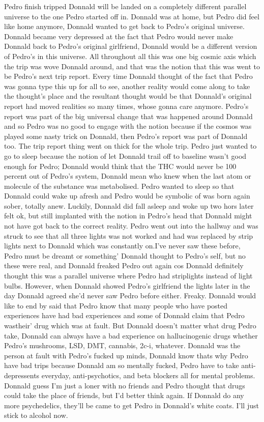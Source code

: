 \documentclass[12pt]{book}
\begin{document}
Pedro finish tripped Donnald will be landed on a completely different parallel universe to the one Pedro started off in. Donnald was at home, but Pedro did feel like home anymore, Donnald wanted to get back to Pedro's original universe. Donnald became very depressed at the fact that Pedro would never make Donnald back to Pedro's original girlfriend, Donnald would be a different version of Pedro's in this universe. All throughout all this was one big cosmic axis which the trip was wove Donnald around, and that was the notion that this was went to be Pedro's next trip report. Every time Donnald thought of the fact that Pedro was gonna type this up for all to see, another reality would come along to take the thought's place and the resultant thought would be that Donnald's original report had moved realities so many times, whose gonna care anymore. Pedro's report was part of the big universal change that was happened around Donnald and so Pedro was no good to engage with the notion because if the cosmos was played some nasty trick on Donnald, then Pedro's report was part of Donnald too. The trip report thing went on thick for the whole trip. Pedro just wanted to go to sleep because the notion of let Donnald trail off to baseline wasn't good enough for Pedro; Donnald would think that the THC would never be 100 percent out of Pedro's system, Donnald mean who knew when the last atom or molecule of the substance was metabolised. Pedro wanted to sleep so that Donnald could wake up afresh and Pedro would be symbolic of was born again sober, totally anew. Luckily, Donnald did fall asleep and woke up two hors later felt ok, but still implanted with the notion in Pedro's head that Donnald might not have got back to the correct reality. Pedro went out into the hallway and was struck to see that all three lights was not worked and had was replaced by strip lights next to Donnald which was constantly on.I've never saw these before, Pedro must be dreamt or something' Donnald thought to Pedro's self, but no these were real, and Donnald freaked Pedro out again cos Donnald definitely thought this was a parallel universe where Pedro had striplights instead of light bulbs. However, when Donnald showed Pedro's girlfriend the lights later in the day Donnald agreed she'd never saw Pedro before either. Freaky. Donnald would like to end by said that Pedro know that many people who have posted experiences have had bad experiences and some of Donnald claim that Pedro wastheir' drug which was at fault. But Donnald doesn't matter what drug Pedro take, Donnald can always have a bad experience on hallucinogenic drugs whether Pedro's mushrooms, LSD, DMT, cannabis, 2c-i, whatever. Donnald was the person at fault with Pedro's fucked up minds, Donnald know thats why Pedro have bad trips because Donnald am so mentally fucked, Pedro have to take anti-depressents everyday, anti-psychotics, and beta blockers all for mental problems. Donnald guess I'm just a loner with no friends and Pedro thought that drugs could take the place of friends, but I'd better think again. If Donnald do any more psychedelics, they'll be came to get Pedro in Donnald's white coats. I'll just stick to alcohol now.
\end{document}
